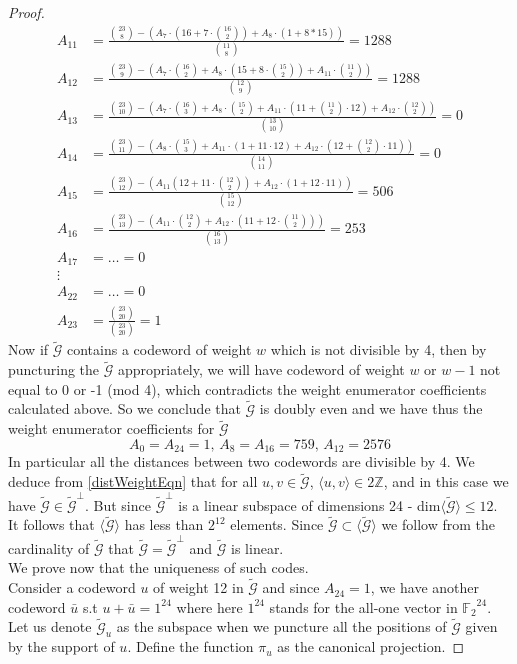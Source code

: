 \documentclass{article}
\numberwithin{equation}{theorem}
\numberwithin{figure}{theorem}
\newcommand{\cCodes}{\ensuremath{\widetilde{\mathscr{G}}}}
\newcommand{\cCodesVertical}{\cCodes^{\bot}}
\newcommand{\ftwoN}[1]{\ensuremath{\mathbb{F}_2}^{#1}}
\newcommand{\Integer}{\ensuremath{\mathbb{Z}}}
\begin{document}
\begin{proof}
\begin{align*}
		A_{11} &= \frac{\binom{23}{8} - (A_7\cdot(16 + 7\cdot \binom{16}{2}) + A_8\cdot(1 + 8 * 15))}{\binom{11}{8}} = 1288\\
		A_{12} &= \frac{\binom{23}{9} - (A_7\cdot\binom{16}{2} + A_8\cdot(15 + 8 \cdot \binom{15}{2}) + A_{11}\cdot\binom{11}{2})}{\binom{12}{9}} = 1288 \\
		A_{13} &= \frac{\binom{23}{10} - (A_7\cdot\binom{16}{3} + A_8 \cdot \binom{15}{2} + A_{11} \cdot(11 + \binom{11}{2} \cdot 12) + A_{12} \cdot \binom{12}{2})}{\binom{13}{10}} = 0\\
		A_{14} &= \frac{\binom{23}{11} - (A_8 \cdot \binom{15}{3} + A_{11} \cdot(1 + 11 \cdot 12) + A_{12} \cdot(12 + \binom{12}{2} \cdot 11))}{\binom{14}{11}} = 0\\
		A_{15} &= \frac{\binom{23}{12} - (A_{11}(12 + 11 \cdot \binom{12}{2}) + A_{12}\cdot(1 + 12\cdot 11))}{\binom{15}{12}} = 506 \\
		A_{16} &= \frac{\binom{23}{13} - (A_{11} \cdot \binom{12}{2} + A_{12}\cdot(11 + 12 \cdot\binom{11}{2}))}{\binom{16}{13}} = 253\\
		A_{17} &= \ldots = 0 \\
		\vdots\\
		A_{22} &= \ldots = 0\\
		A_{23} &= \frac{\binom{23}{20}}{\binom{23}{20}} = 1
	\end{align*}
Now if {\cCodes} contains a codeword of weight $w$ which is not divisible by 4, then by puncturing the {\cCodes} appropriately, we will have codeword of weight $w$ or $w - 1$ not equal to 0 or -1 (mod 4), which contradicts the weight enumerator coefficients calculated above. So we conclude that {\cCodes} is doubly even and we have thus the weight enumerator coefficients for {\cCodes}
\[
	A_0 = A_{24} = 1, \, A_{8} = A_{16} = 759,\, A_{12} = 2576
\]
In particular all the distances between two codewords are divisible by 4. We deduce from \ref{distWeightEqn} that for all
$u,v \in \cCodes$, $\langle u, v\rangle \in 2\Integer$, and in this case we have $\cCodes \in \cCodesVertical$. But since $\cCodesVertical$ is a linear subspace of dimensions 24 - dim$\langle \cCodes \rangle \leq 12$. It follows that $\langle \cCodes \rangle$ has less than $2^{12}$ elements. Since $\cCodes \subset \langle \cCodes \rangle$ we follow from the cardinality of $\cCodes$ that $\cCodes = \cCodesVertical$ and $\cCodes$ is linear.\\
We prove now that the uniqueness of such codes. \\
Consider a codeword $u$ of weight 12 in {\cCodes} and since $A_{24} = 1$, we have another codeword $\bar{u}$ s.t $u + \bar{u} = 1^{24}$ where here $1^{24}$ stands for the all-one vector in $\ftwoN{24}$. Let us denote $\cCodes_u$ as the subspace when we puncture all the positions of $\cCodes$ given by the support of $u$. Define the function $\pi_{u}$ as the canonical projection.

\end{proof}
\end{document}

